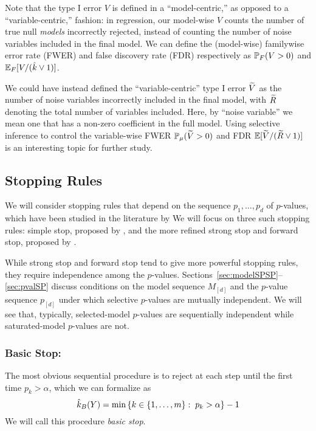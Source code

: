 \documentclass{article}
\begin{document}
Note that the type I error $V$ is defined in a ``model-centric,'' as opposed to a ``variable-centric,'' fashion: in regression, our model-wise $V$ counts the number of true null {\em models} incorrectly rejected, instead of counting the number of noise variables included in the final model. We can define the (model-wise) familywise error rate (FWER) and false discovery rate (FDR) respectively as $\P_F(V >0)$ and $\E_F[V/(\hk \vee 1)]$. 

We could have instead defined the ``variable-centric'' type I error $\tV$ as the number of noise variables incorrectly included in the final model, with $\tR$ denoting the total number of variables included. Here, by ``noise variable'' we mean one that has a non-zero coefficient in the full model. Using selective inference to control the variable-wise FWER $\P_\mu(\tV>0)$ and FDR $\E[\tV / (\tR \vee 1)]$ is an interesting topic for further study.

\subsection{Stopping Rules}

We will consider stopping rules that depend on the sequence $p_1,\ldots,p_d$ of $p$-values, which have been studied in the literature by  We will focus on three such stopping rules: simple stop, proposed by , and the more refined strong stop and forward stop, proposed by \citet{gsell2013sequential}. 

While strong stop and forward stop tend to give more powerful stopping rules, they require independence among the $p$-values. Sections~\ref{sec:modelSPSP}--\ref{sec:pvalSP} discuss conditions on the model sequence $M_{[d]}$ and the $p$-value sequence $p_{[d]}$ under which selective $p$-values are mutually independent. We will see that, typically, selected-model $p$-values are sequentially independent while saturated-model $p$-values are not.

\subsubsection{Basic Stop:}


The most obvious sequential procedure is to reject at each step until the first time $p_k > \alpha$, which we can formalize as
\[
\hk_B(Y) = \min\left\{k \in \{1,\ldots,m\} :\;
  p_k > \alpha\right\} - 1
\]
We will call this procedure {\em basic stop}. 
\end{document}
